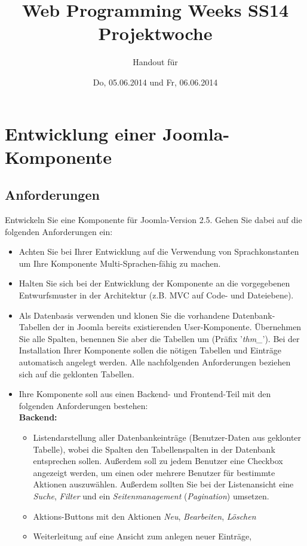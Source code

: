 \documentclass[]{article}
\date{Do, 05.06.2014 und Fr, 06.06.2014}
\title{Web Programming Weeks SS14 \\Projektwoche}
\author{Handout für}
\begin{document}
\maketitle

\section{Entwicklung einer Joomla-Komponente}
\subsection{Anforderungen}
Entwickeln Sie eine Komponente für Joomla-Version 2.5. Gehen Sie dabei auf die folgenden Anforderungen ein:
\begin{itemize}
	\item Achten Sie bei Ihrer Entwicklung auf die Verwendung von Sprachkonstanten um Ihre Komponente Multi-Sprachen-fähig zu machen.
	\item Halten Sie sich bei der Entwicklung der Komponente an die vorgegebenen Entwurfsmuster in der Architektur (z.B. MVC auf Code- und Dateiebene).
	\item Als Datenbasis verwenden und klonen Sie die vorhandene Datenbank-Tabellen der in Joomla bereits existierenden User-Komponente. Übernehmen Sie alle Spalten, benennen Sie aber die Tabellen um (Präfix '\textit{thm\_}'). Bei der Installation Ihrer Komponente sollen die nötigen Tabellen und Einträge automatisch angelegt werden. Alle nachfolgenden Anforderungen beziehen sich auf die geklonten Tabellen.
	\item Ihre Komponente soll aus einen Backend- und Frontend-Teil mit den folgenden Anforderungen bestehen:\\
	\textbf{Backend:}
	\begin{itemize}
		\item Listendarstellung aller Datenbankeinträge (Benutzer-Daten aus geklonter Tabelle), wobei die Spalten den Tabellenspalten in der Datenbank entsprechen sollen. Außerdem soll zu jedem Benutzer eine Checkbox angezeigt werden, um einen oder mehrere Benutzer für bestimmte Aktionen auszuwählen. Außerdem sollten Sie bei der Listenansicht eine \textit{Suche}, \textit{Filter} und ein \textit{Seitenmanagement} (\textit{Pagination}) umsetzen.
		\item Aktions-Buttons mit den Aktionen \textit{Neu}, \textit{Bearbeiten}, \textit{Löschen}
		\item Weiterleitung auf eine Ansicht zum anlegen neuer Einträge, 
		\begin{itemize}

\end{itemize}
\end{itemize}
\end{itemize}
\end{document}
